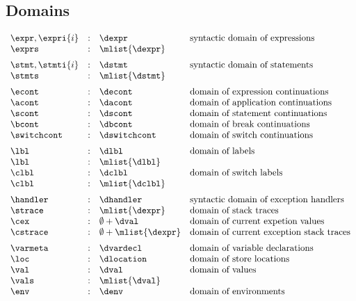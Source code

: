 \documentclass{article}
\begin{document}
\subsection{Domains}
\label{subsec:domains}
\[
\begin{array}{lcll}

\expr, \expri{i} & : & \dexpr & \textrm{syntactic domain of expressions}\\
\exprs & : & \mlist{\dexpr}  & \textrm{}\\[2mm]

\stmt, \stmti{i} & : & \dstmt & \textrm{syntactic domain of statements}\\
\stmts & : & \mlist{\dstmt}  & \textrm{}\\[2mm]

\econt & : & \decont & \textrm{domain of expression continuations}\\
\acont & : & \dacont & \textrm{domain of application continuations}\\
\scont & : & \dscont & \textrm{domain of statement continuations}\\
\bcont & : & \dbcont & \textrm{domain of break continuations}\\
\switchcont & : & \dswitchcont & \textrm{domain of switch continuations}\\[2mm]

\lbl & : & \dlbl & \textrm{domain of labels}\\
\lbl & : & \mlist{\dlbl} \\
\clbl & : & \dclbl & \textrm{domain of switch labels}\\
\clbl & : & \mlist{\dclbl} \\[2mm]

\handler & : & \dhandler & \textrm{syntactic domain of exception handlers} \\
\strace & : & \mlist{\dexpr} & \textrm{domain of stack traces}\\
\cex & : &  \emptyset + \dval & \textrm{domain of current expetion values}\\
\cstrace & : & \emptyset + \mlist{\dexpr} & \textrm{domain of current exception stack traces}\\[2mm]

\varmeta & : & \dvardecl & \textrm{domain of variable declarations}\\
\loc & : & \dlocation & \textrm{domain of store locations}\\
\val & : & \dval & \textrm{domain of values} \\ 
\vals & : & \mlist{\dval}\\
\env & : & \denv & \textrm{domain of environments}  

\end{array}
\]
\end{document}
